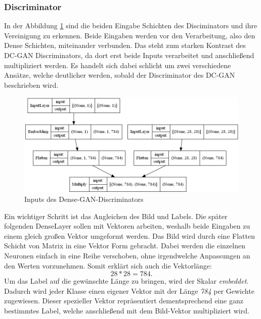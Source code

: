 \subsubsection{Discriminator}
In der Abbildung \ref{architecture:densegan-dis-input} sind die beiden Eingabe Schichten des Disciminators und ihre Vereinigung zu erkennen.
Beide Eingaben werden vor den Verarbeitung, also den Dense Schichten, miteinander verbunden.
Das steht zum starken Kontrast des DC-GAN Discriminators, da dort erst beide Inputs verarbeitet und anschließend multipliziert werden.
Es handelt sich dabei schlicht um zwei verschiedene Ansätze, welche deutlicher werden, sobald der Discriminator des DC-GAN beschrieben wird.

\begin{figure}[H]
	\centering
	\includegraphics[height=0.3\textheight]{kapitel/5_ergebnisse/architectures/densegan_discriminator/inputs.png}
	\caption{Inputs des Dense-GAN-Discriminators}
	\label{architecture:densegan-dis-input}
\end{figure}

Ein wichtiger Schritt ist das Angleichen des Bild und Labels.
Die später folgenden DenseLayer sollen mit Vektoren arbeiten, weshalb beide Eingaben zu einem gleich großen Vektor umgeformt werden.
Das Bild wird durch eine Flatten Schicht von Matrix in eine Vektor Form gebracht. 
Dabei werden die einzelnen Neuronen einfach in eine Reihe verschoben, ohne irgendwelche Anpassungen an den Werten vorzunehmen.
Somit erklärt sich auch die Vektorlänge: \begin{equation}
	28 * 28 = 784.
\end{equation}
Um das Label auf die gewünschte Länge zu bringen, wird der Skalar \textit{embeddet}.
Dadurch wird jeder Klasse einen eigener Vektor mit der Länge \textit{784} per Gewichte zugewiesen.
Dieser spezieller Vektor repräsentiert dementsprechend eine ganz bestimmtes Label, welche anschließend mit dem Bild-Vektor multipliziert wird.
\newline

